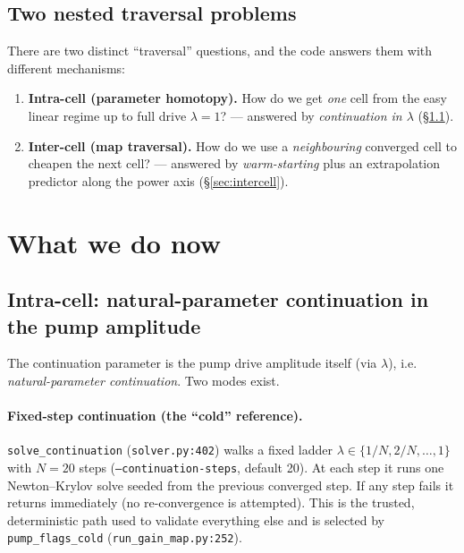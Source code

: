\documentclass[11pt]{article}
\newcommand{\code}[1]{\texttt{\small #1}}
\begin{document}
\subsection{Two nested traversal problems}
There are two distinct ``traversal'' questions, and the code answers them with
different mechanisms:
\begin{enumerate}[leftmargin=*]
  \item \textbf{Intra-cell (parameter homotopy).} How do we get \emph{one} cell
    from the easy linear regime up to full drive $\lambda=1$? --- answered by
    \emph{continuation in $\lambda$} (\S\ref{sec:intracell}).
  \item \textbf{Inter-cell (map traversal).} How do we use a \emph{neighbouring}
    converged cell to cheapen the next cell? --- answered by \emph{warm-starting}
    plus an extrapolation predictor along the power axis (\S\ref{sec:intercell}).
\end{enumerate}

\section{What we do now}

\subsection{Intra-cell: natural-parameter continuation in the pump amplitude}
\label{sec:intracell}

The continuation parameter is the pump drive amplitude itself (via $\lambda$),
i.e. \emph{natural-parameter continuation}. Two modes exist.

\paragraph{Fixed-step continuation (the ``cold'' reference).}
\code{solve\_continuation} (\code{solver.py:402}) walks a fixed ladder
$\lambda \in \{1/N, 2/N, \dots, 1\}$ with $N=20$ steps
(\code{--continuation-steps}, default 20). At each step it runs one
Newton--Krylov solve seeded from the previous converged step. If any step fails
it returns immediately (no re-convergence is attempted). This is the trusted,
deterministic path used to validate everything else and is selected by
\code{pump\_flags\_cold} (\code{run\_gain\_map.py:252}).
\end{document}
